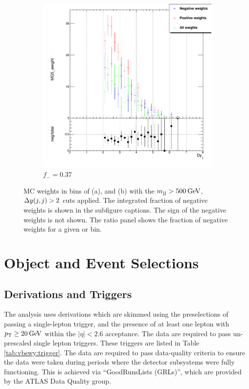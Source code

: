 \begin{figure}[t]
\begin{subfigure}[b]{0.49\textwidth}
    \includegraphics[width=\textwidth]{plots/diffx/int_dyjj_3.png}
    \caption{$f_-=0.37$}
\end{subfigure}
\caption{MC weights in bins of \mjj (a), and \dyjj (b) with the $m_{\text{jj}}>500\hspace{2pt}\text{Ge\kern -0.1em V}$, $\Delta y(j,j)>2$ cuts applied. The integrated fraction of negative weights is shown in the subfigure captions. The sign of the negative weights is not shown. The ratio panel shows the fraction of negative weights for a given \mjj or \dyjj bin. \label{fig:vbswy:intweights}}
\end{figure}

\section{Object and Event Selections}

\subsection{Derivations and Triggers}

The analysis uses derivations which are skimmed using the preselections of passing a single-lepton trigger, and the presence of at least one lepton with $p_{\text{T}}\geq20\hspace{2pt}\text{Ge\kern -0.1em V}$ within the $|\eta|<2.6$ acceptance. The data are required to pass un-prescaled single lepton triggers. These triggers are listed in Table \ref{tab:vbswy:trigger}. The data are required to pass data-quality criteria to ensure the data were taken during periods where the detector subsystems were fully functioning. This is achieved via ``GoodRunsLists (GRLs)'', which are provided by the ATLAS Data Quality group. 


